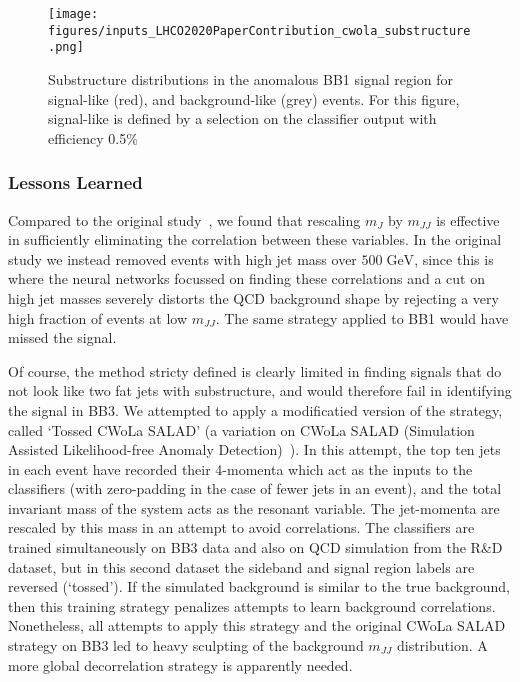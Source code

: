 \documentclass[a4paper,11pt]{article}
\begin{document}
\begin{figure}[h!]
    \centering
    \texttt{[image: figures/inputs\_LHCO2020PaperContribution\_cwola\_substructure.png]}
    \caption{Substructure distributions in the anomalous BB1 signal region for signal-like (red), and background-like (grey) events. For this figure, signal-like is defined by a selection on the classifier output with efficiency 0.5\%}
    \label{fig:substructure}
\end{figure}

\subsubsection{Lessons Learned}
\label{sec:lessons}

Compared to the original study~\cite{Collins:2018epr,Collins:2019jip}, we found that rescaling $m_J$ by $m_{JJ}$ is effective in sufficiently eliminating the correlation between these variables. In the original study we instead removed events with high jet mass over $500 \; \text{GeV}$, since this is where the neural networks focussed on finding these correlations and a cut on high jet masses severely distorts the QCD background shape by rejecting a very high fraction of events at low $m_{JJ}$. The same strategy applied to BB1 would have missed the signal.

Of course, the method stricty defined is clearly limited in finding signals that do not look like two fat jets with substructure, and would therefore fail in identifying the signal in BB3. We attempted to apply a modificatied version of the strategy, called `Tossed CWoLa SALAD' (a variation on CWoLa SALAD (Simulation Assisted Likelihood-free Anomaly Detection)~\cite{1815227}). In this attempt, the top ten jets in each event have recorded their 4-momenta which act as the inputs to the classifiers (with zero-padding in the case of fewer jets in an event), and the total invariant mass of the system acts as the resonant variable. The jet-momenta are rescaled by this mass in an attempt to avoid correlations. The classifiers are trained simultaneously on BB3 data and also on QCD simulation from the R\&D dataset, but in this second dataset the sideband and signal region labels are reversed (`tossed'). If the simulated background is similar to the true background, then this training strategy penalizes attempts to learn background correlations. Nonetheless, all attempts to apply this strategy and the original CWoLa SALAD strategy on BB3 led to heavy sculpting of the background $m_{JJ}$ distribution. A more global decorrelation strategy is apparently needed.
\end{document}
